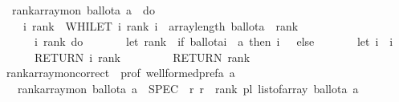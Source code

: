 \begin{isabellebody}
\ \ {\isachardoublequoteopen}rank{\isacharunderscore}{\kern0pt}array{\isacharunderscore}{\kern0pt}mon\ ballot{\isacharunderscore}{\kern0pt}a\ a\ {\isasymequiv}\ do\ {\isacharbraceleft}{\kern0pt}\isanewline
\ \ \ \ {\isacharparenleft}{\kern0pt}i{\isacharcomma}{\kern0pt}\ rank{\isacharparenright}{\kern0pt}\ {\isasymleftarrow}\ WHILET\ {\isacharparenleft}{\kern0pt}{\isasymlambda}{\isacharparenleft}{\kern0pt}i{\isacharcomma}{\kern0pt}\ rank{\isacharparenright}{\kern0pt}{\isachardot}{\kern0pt}\ {\isacharparenleft}{\kern0pt}i\ {\isacharless}{\kern0pt}\ {\isacharparenleft}{\kern0pt}array{\isacharunderscore}{\kern0pt}length\ ballot{\isacharunderscore}{\kern0pt}a{\isacharparenright}{\kern0pt}\ {\isasymand}\ rank\ {\isacharequal}{\kern0pt}\ {}{\isacharparenright}{\kern0pt}{\isacharparenright}{\kern0pt}\ \isanewline
\ \ \ \ \ \ {\isacharparenleft}{\kern0pt}{\isasymlambda}{\isacharparenleft}{\kern0pt}i{\isacharcomma}{\kern0pt}\ rank{\isacharparenright}{\kern0pt}{\isachardot}{\kern0pt}\ do\ {\isacharbraceleft}{\kern0pt}\isanewline
\ \ \ \ \ \ let\ rank\ {\isacharequal}{\kern0pt}\ {\isacharparenleft}{\kern0pt}if\ {\isacharparenleft}{\kern0pt}ballot{\isacharunderscore}{\kern0pt}a{\isacharbrackleft}{\kern0pt}{\isacharbrackleft}{\kern0pt}i{\isacharbrackright}{\kern0pt}{\isacharbrackright}{\kern0pt}\ {\isacharequal}{\kern0pt}\ a{\isacharparenright}{\kern0pt}\ then\ {\isacharparenleft}{\kern0pt}i\ {\isacharplus}{\kern0pt}\ {}{\isacharparenright}{\kern0pt}\ else\ {}{\isacharparenright}{\kern0pt}{\isacharsemicolon}{\kern0pt}\isanewline
\ \ \ \ \ \ let\ i\ {\isacharequal}{\kern0pt}\ i\ {\isacharplus}{\kern0pt}\ {}{\isacharsemicolon}{\kern0pt}\isanewline
\ \ \ \ \ \ RETURN\ {\isacharparenleft}{\kern0pt}i{\isacharcomma}{\kern0pt}\ rank{\isacharparenright}{\kern0pt}\isanewline
\ \ \ \ {\isacharbraceright}{\kern0pt}{\isacharparenright}{\kern0pt}{\isacharparenleft}{\kern0pt}{}{\isacharcomma}{\kern0pt}{}{\isacharparenright}{\kern0pt}{\isacharsemicolon}{\kern0pt}\isanewline
\ \ \ \ RETURN\ rank\isanewline
\ \ {\isacharbraceright}{\kern0pt}{\isachardoublequoteclose}\isanewline
\isanewline
{}\isamarkupfalse%
\ rank{\isacharunderscore}{\kern0pt}array{\isacharunderscore}{\kern0pt}mon{\isacharunderscore}{\kern0pt}correct{\isacharcolon}{\kern0pt}\ \ prof{\isacharcolon}{\kern0pt}\ {\isachardoublequoteopen}well{\isacharunderscore}{\kern0pt}formed{\isacharunderscore}{\kern0pt}prefa\ a{\isachardoublequoteclose}\ \isanewline
\ \ \ {\isachardoublequoteopen}rank{\isacharunderscore}{\kern0pt}array{\isacharunderscore}{\kern0pt}mon\ ballot{\isacharunderscore}{\kern0pt}a\ a\ {\isasymle}\ SPEC\ {\isacharparenleft}{\kern0pt}{\isasymlambda}\ r{\isachardot}{\kern0pt}\ r\ {\isacharequal}{\kern0pt}\ rank\ {\isacharparenleft}{\kern0pt}pl{\isacharunderscore}{\kern0pt}{\isasymalpha}\ {\isacharparenleft}{\kern0pt}list{\isacharunderscore}{\kern0pt}of{\isacharunderscore}{\kern0pt}array\ ballot{\isacharunderscore}{\kern0pt}a{\isacharparenright}{\kern0pt}{\isacharparenright}{\kern0pt}\ a{\isacharparenright}{\kern0pt}{\isachardoublequoteclose}\isanewline

\end{isabellebody}
